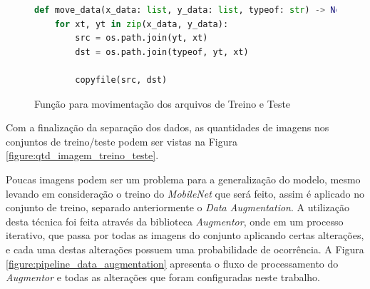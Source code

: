 \begin{figure}[H]
    \centering
    \caption{Função para movimentação dos arquivos de Treino e Teste}
    \begin{lstlisting}[language=Python]
def move_data(x_data: list, y_data: list, typeof: str) -> None:
    for xt, yt in zip(x_data, y_data):
        src = os.path.join(yt, xt)
        dst = os.path.join(typeof, yt, xt)
        
        copyfile(src, dst)
\end{lstlisting}
    \label{figure:move_splitted_data}
\end{figure}

\par Com a finalização da separação dos dados, as quantidades de imagens nos conjuntos de treino/teste podem ser vistas na Figura \ref{figure:qtd_imagem_treino_teste}.


\par Poucas imagens podem ser um problema para a generalização do modelo, mesmo levando em consideração o treino do \textit{MobileNet} que será feito, assim é aplicado no conjunto de treino, separado anteriormente o \textit{Data Augmentation}. A utilização desta técnica foi feita através da biblioteca \textit{Augmentor}, onde em um processo iterativo, que passa por todas as imagens do conjunto aplicando certas alterações, e cada uma destas alterações possuem uma probabilidade de ocorrência. A Figura \ref{figure:pipeline_data_augmentation} apresenta o fluxo de processamento do \textit{Augmentor} e todas as alterações que foram configuradas neste trabalho.



